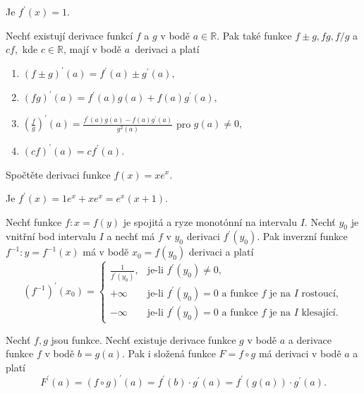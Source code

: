\begin{reseni}
  Je $f^\prime(x)=1.$
\end{reseni}

\begin{veta}
Nechť existují derivace funkcí $f$ a $g$ v bodě $a\in \mathbb R.$ Pak
také funkce $f\pm g, fg, f/g$ a $cf,$ kde $c\in \mathbb R$, mají v bodě $a$~derivaci a platí
\begin{enumerate}[$i.$]
\item $(f\pm g)^\prime (a) = f^\prime(a) \pm g^\prime(a),$
\item $(fg)^\prime (a) = f^\prime (a)g(a)+ f(a)g^\prime(a),$
\item $\left ( \frac{f}{g} \right )^\prime(a)=\frac{f^\prime (a)g(a)-f(a)g^\prime(a)}{g^2(a)} $ pro $g(a)\ne 0,$
\item $(cf)^\prime(a)=cf^\prime (a).$
\end{enumerate}
\end{veta}

\begin{priklad}
  Spočtěte derivaci funkce $f(x)=xe^x.$
\end{priklad}

\begin{reseni}
  Je $f^\prime(x)=1e^x+xe^x=e^x(x+1)$.
\end{reseni}

\begin{veta}
Nechť funkce $f\colon x=f(y)$ je spojitá a ryze monotónní na intervalu $I.$ Nechť $y_0$
je vnitřní bod intervalu $I$ a nechť má $f$ v $y_0$ derivaci $f^\prime(y_0).$
Pak inverzní funkce $f^{-1}\colon y=f^{-1}(x)$ má v bodě $x_0=f(y_0)$ derivaci a platí
$$
\left ( f^{-1} \right )^\prime(x_0)= \begin{cases}
\frac{1}{f^\prime(y_0)}, & \textrm{je-li } f^\prime(y_0)\ne 0,\\
+\infty & \textrm{je-li } f^\prime (y_0)=0 \textrm{ a funkce } f \textrm{ je na } I \textrm{ rostoucí},\\
-\infty & \textrm{je-li } f^\prime (y_0)=0 \textrm{ a funkce } f \textrm{ je na } I \textrm{ klesající}.
\end{cases}
$$
\end{veta}

\begin{veta}
Nechť $f, g$ jsou funkce. Nechť existuje derivace funkce $g$ v bodě $a$ a
derivace funkce $f$ v bodě $b=g(a).$ Pak i složená funkce $F=f \circ g$ má derivaci
v bodě $a$ a platí
$$F^\prime(a)=(f \circ g)^\prime (a) = f^\prime(b)\cdot g^\prime(a)=f^\prime(g(a))\cdot g^\prime(a).$$
\end{veta}

